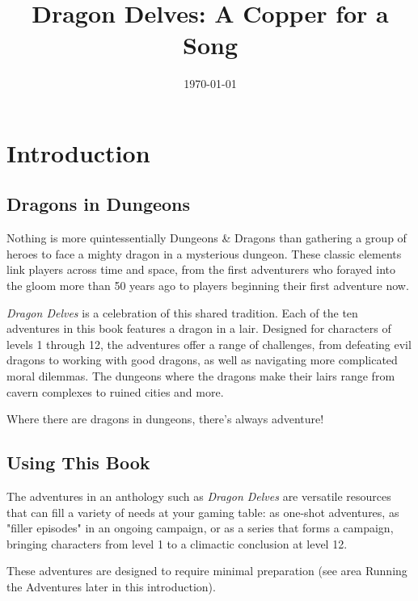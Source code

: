 \documentclass[letterpaper, 11pt, twocolumn]{dndbook}
\title{Dragon Delves: A Copper for a Song}
\date{\today}
\begin{document}
\frontmatter

\maketitle
\thispagestyle{empty}
\clearpage

\tableofcontents
\clearpage

\mainmatter

\chapter{Introduction}\label{ch:introduction-1-1}

\section{Dragons in Dungeons}

Nothing is more quintessentially Dungeons \& Dragons than gathering a group of heroes to face a mighty dragon in a mysterious dungeon. These classic elements link players across time and space, from the first adventurers who forayed into the gloom more than 50 years ago to players beginning their first adventure now.

\textit{Dragon Delves} is a celebration of this shared tradition. Each of the ten adventures in this book features a dragon in a lair. Designed for characters of levels 1 through 12, the adventures offer a range of challenges, from defeating evil dragons to working with good dragons, as well as navigating more complicated moral dilemmas. The dungeons where the dragons make their lairs range from cavern complexes to ruined cities and more.

Where there are dragons in dungeons, there's always adventure!
\section{Using This Book}

The adventures in an anthology such as \textit{Dragon Delves} are versatile resources that can fill a variety of needs at your gaming table: as one-shot adventures, as "filler episodes" in an ongoing campaign, or as a series that forms a campaign, bringing characters from level 1 to a climactic conclusion at level 12.

These adventures are designed to require minimal preparation (see area Running the Adventures later in this introduction).
\end{document}
